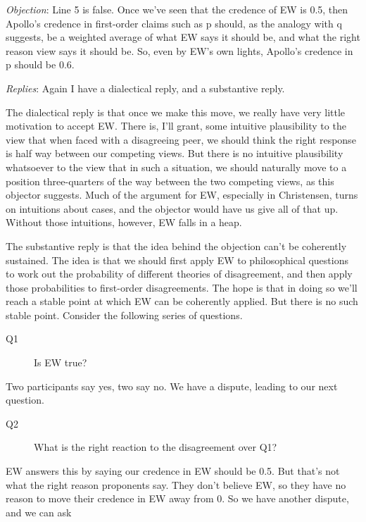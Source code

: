 \medskip \noindent \textit{Objection}: Line 5 is false. Once we've seen that the credence of EW is 0.5, then Apollo's credence in first-order claims such as p should, as the analogy with q suggests, be a weighted average of what EW says it should be, and what the right reason view says it should be. So, even by EW's own lights, Apollo's credence in p should be 0.6.

\smallskip \noindent \textit{Replies}: Again I have a dialectical reply, and a substantive reply.

The dialectical reply is that once we make this move, we really have very little motivation to accept EW. There is, I'll grant, some intuitive plausibility to the view that when faced with a disagreeing peer, we should think the right response is half way between our competing views. But there is no intuitive plausibility whatsoever to the view that in such a situation, we should naturally move to a position three-quarters of the way between the two competing views, as this objector suggests. Much of the argument for EW, especially in Christensen, turns on intuitions about cases, and the objector would have us give all of that up. Without those intuitions, however, EW falls in a heap.

The substantive reply is that the idea behind the objection can't be coherently sustained. The idea is that we should first apply EW to philosophical questions to work out the probability of different theories of disagreement, and then apply those probabilities to first-order disagreements. The hope is that in doing so we'll reach a stable point at which EW can be coherently applied. But there is no such stable point. Consider the following series of questions.

\begin{description}
\item[Q1] Is EW true?
\end{description}

\noindent Two participants say yes, two say no. We have a dispute, leading to our next question.

\begin{description}
\item[Q2] What is the right reaction to the disagreement over Q1?
\end{description}

\noindent EW answers this by saying our credence in EW should be 0.5. But that's not what the right reason proponents say. They don't believe EW, so they have no reason to move their credence in EW away from 0. So we have another dispute, and we can ask

